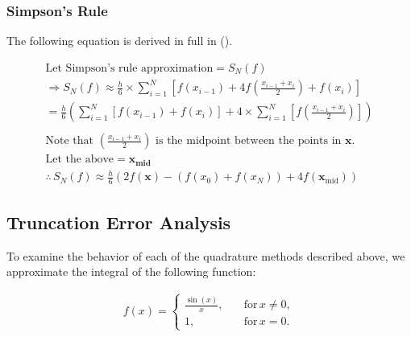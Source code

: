 \documentclass[10pt]{article}
\begin{document}
        

        \pagebreak[4]
        \subsubsection{Simpson's Rule}

        The following equation is derived in full in (\cite{Florescu2019}).

        \begin{gather*}
            \text{Let Simpson's rule approximation} = S_N(f) \\
            \Rightarrow S_N(f) \approx \frac{h}{6} \times \sum_{i=1}^N \left[ f(x_{i-1}) + 4f \left( \frac{x_{i-1} + x_i}{2} \right) + f(x_i) \right] \\
            = \frac{h}{6} \left( \sum_{i=1}^N [f(x_{i-1}) + f(x_i)] + 4 \times \sum_{i=1}^N \left[ f \left( \frac{x_{i-1} + x_i}{2} \right) \right] \right) \\
            \\
            \text{Note that $\left( \frac{x_{i-1} + x_i}{2} \right)$ is the midpoint between the points in $\boldsymbol{x}$.} \\
            \text{Let the above} = \boldsymbol{x_\text{mid}} \\
            \therefore \, S_N(f) \approx \frac{h}{6} \left( 2f(\boldsymbol{x}) - (f(x_0) + f(x_N)) + 4f(\boldsymbol{x}_\text{mid}) \right)
        \end{gather*}

        
    
    \pagebreak[3]
    \subsection{Truncation Error Analysis} \label{section:q3:trunc_error}

    To examine the behavior of each of the quadrature methods described above, we approximate the integral of the following function:

    \begin{gather*}
        f(x) =
        \begin{cases}
            \frac{\sin{(x)}}{x}, & \quad \text{for} \, x \neq 0, \\
            1, & \quad \text{for} \, x = 0.
        \end{cases}
    \end{gather*}
\end{document}

